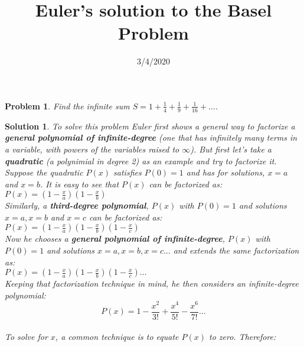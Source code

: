 \documentclass{article}
\title{Euler's solution to the Basel Problem}
\date{3/4/2020}
\newtheorem*{problem*}{Problem}
\newtheorem*{solution*}{Solution}
\begin{document}
\maketitle
 
\begin{problem*}
    Find the infinite sum
    $S=1+\frac{1}{4}+\frac{1}{9}+\frac{1}{16}+\dots$.
\end{problem*}

\begin{solution*}
    To solve this problem Euler first shows
    a general way to factorize a \textbf{general polynomial of infinite-degree}
    (one that has infinitely many terms in a variable,
    with powers of the variables raised to $\infty$).
    But first let's take a \textbf{quadratic} 
    (a polynimial in degree 2) as an example and 
    try to factorize it. Suppose the quadratic $P(x)$ 
    satisfies $P(0)=1$ and has for solutions, 
    $x=a$ and $x=b$. It is easy to see that $P(x)$
    can be factorized as:\\
    
    $P(x)=(1-\frac{x}{a})(1-\frac{x}{b})$\\
    
    Similarly, a \textbf{third-degree polynomial}, $P(x)$ 
    with $P(0)=1$ and solutions $x=a,x=b$ and $x=c$ 
    can be factorized as:\\
    
    $P(x)=(1-\frac{x}{a})(1-\frac{x}{b})(1-\frac{x}{c})$\\

    Now he chooses a \textbf{general polynomial of infinite-degree}, 
    $P(x)$ with $P(0)=1$ and solutions $x=a,x=b,x=c\dots$
    and extends the same factorization as:\\
    
    $P(x)=(1-\frac{x}{a})(1-\frac{x}{b})(1-\frac{x}{c})\dots$\\

    Keeping that factorization technique in mind,
    he then considers an infinite-degree polynomial:\\

    \begin{equation}
        P(x) = 1-\frac{x^2}{3!}+\frac{x^4}{5!}-\frac{x^6}{7!}\dots
    \end{equation}\\


    To solve for $x$, a common technique is to equate 
    $P(x)$ to zero. Therefore:\\
    

\end{solution*}
\end{document}
